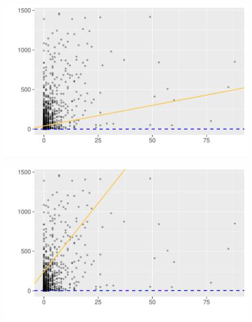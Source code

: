 \begin{minipage}{.5\textwidth}
	\centering
	\includegraphics[page=1,scale=0.3]{../hypotheses/lm_issues_model_5_6.pdf}
  \label{fig:hyp1_issue_model_5-6}
\end{minipage}
\begin{minipage}{.5\textwidth}
	\centering
	\includegraphics[page=1,scale=0.3]{../hypotheses/lm_issues_model_7_8.pdf}
  \label{fig:hyp1_issue_model_7-8}
\end{minipage}

\vspace{20 pt}

